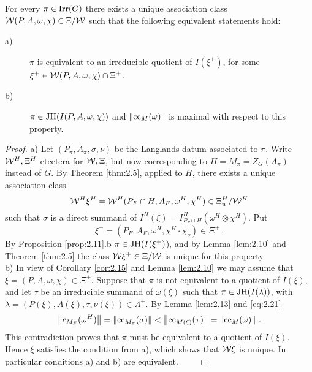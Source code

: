 \begin{thm}\label{thm:2.12}
For every $\pi \in \mathrm{Irr}(G)$ there exists a unique association class\\ 
$\mathcal W (P,A,\omega ,\chi ) \in \Xi / \mathcal W$ such that the following equivalent statements hold:
\begin{description}
\item[a)] $\pi$ is equivalent to an irreducible quotient of $I (\xi^+ )$, for some\\ 
$\xi^+ \in \mathcal W (P,A,\omega ,\chi ) \cap \Xi^+$.
\item[b)] $\pi \in \mathrm{JH}(I (P,A,\omega ,\chi ))$ and $\left\| \mathrm{cc}_M (\omega ) \right\|$ 
is maximal with respect to this property.
\end{description}
\end{thm}
\emph{Proof.} 
a) Let $(P_\pi ,A_\pi ,\sigma ,\nu )$ be the Langlands datum associated to $\pi$. 
Write $\mathcal W^H, \Xi^H$ etcetera for $\mathcal W, \Xi$, but now corresponding to 
$H = M_\pi = Z_G (A_\pi )$ instead of $G$. By Theorem \ref{thm:2.5}, applied to $H$, 
there exists a unique association class
\[
\mathcal W^H \xi^H = \mathcal W^H (P_F \cap H ,A_F ,\omega^H ,\chi^H ) \in \Xi^H_u / \mathcal W^H
\]
such that $\sigma$ is a direct summand of 
$I^H (\xi ) = I_{P_F \cap H}^H (\omega^H \otimes \chi^H )$. Put 
\[
\xi^+ = (P_F ,A_F ,\omega^H, \chi^H \cdot \chi_\nu ) \in \Xi^+ \,.
\] 
By Proposition \ref{prop:2.11}.b $\pi \in \mathrm{JH}(I (\xi^+ )$), and by Lemma \ref{lem:2.10} and 
Theorem \ref{thm:2.5} the class $\mathcal W \xi^+ \in \Xi / \mathcal W$ is unique for this property.\\
b) In view of Corollary \ref{cor:2.15} and Lemma \ref{lem:2.10} we may assume that 
$\xi = (P,A,\omega ,\chi ) \in \Xi^+$. Suppose that $\pi$ is not equivalent to a quotient of 
$I(\xi )$, and let $\tau$ be an irreducible summand of $\omega (\xi )$ such that 
$\pi \in \mathrm{JH}(I (\lambda ))$, with $\lambda = (P(\xi ) ,A(\xi ), \tau ,\nu (\xi )) \in \Lambda^+$. 
By Lemma \ref{lem:2.13} and \eqref{eq:2.21}
\[
\left\| c_{M_F}(\omega^H) \right\| = \left\| \mathrm{cc}_{M_\pi}(\sigma) \right\| <  
\left\| \mathrm{cc}_{M(\xi )}(\tau) \right\| = \left\| \mathrm{cc}_M (\omega) \right\| \,.
\]
This contradiction proves that $\pi$ must be equivalent to a quotient of $I(\xi )$.
Hence $\xi$ satisfies the condition from a), which shows that $\mathcal W \xi$ is unique.
In particular conditions a) and b) are equivalent. $\qquad \Box$
\\[2mm]

